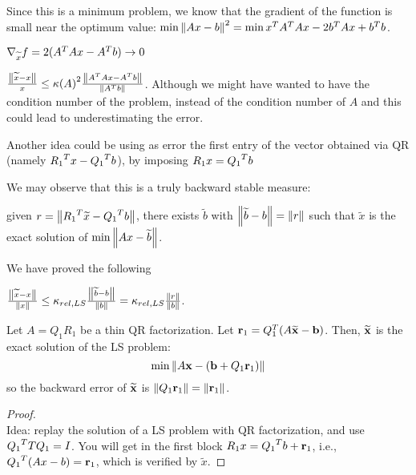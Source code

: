 \documentclass[ComputationalMathematics.tex]{subfiles}
\begin{document}
  Since this is a minimum problem, we know that the gradient of the function is small near the optimum value: $\min {\left\lVert Ax - b\right\rVert}^2 = \min {x}^{T} {A}^{T} A x  - 2 {b}^{T} A x + {b}^{T} b$.

  $\nabla_{\widetilde{x}} f = 2 ({A}^{T} A x - {A}^{T} b) \to 0$

  \begin{theorem}
    $\frac{\left\lVert\widetilde{x} - x\right\rVert}{x} \le {\kappa(A)}^2 \frac{\left\lVert{A}^{T} A x - {A}^{T} b\right\rVert}{\left\lVert{A}^{T} b\right\rVert}$. Although we might have wanted to have the condition number of the problem, instead of the condition number of $A$ and this could lead to underestimating the error.
  \end{theorem}

Another idea could be using as error the first entry of the vector obtained via QR (namely ${R_1}^{T} x - {Q_1}^{T} b$), by imposing $R_1 x = {Q_1}^{T} b$

We may observe that this is a truly backward stable measure:

given $r = \left\lVert{R_1}^{T} \widetilde{x} - {Q_1}^{T} b\right\rVert$, there exists $\widetilde{b}$ with $\left\lVert\widetilde{b} - b\right\rVert = \left\lVert r\right\rVert$ such that $\widetilde{x}$ is the exact solution of $\min \left\lVert Ax - \widetilde{b}\right\rVert$.

We have proved the following

\begin{proposition}
  $\frac{\left\lVert\widetilde{x} - x\right\rVert}{\left\lVert x\right\rVert} \le \kappa_{rel, LS} \frac{\left\lVert\widetilde{b} - b\right\rVert}{\left\lVert b\right\rVert} = \kappa_{rel, LS} \frac{\left\lVert r\right\rVert}{\left\lVert b\right\rVert}$.
\end{proposition}


\begin{theorem}
  Let $A=Q_1R_1$ be a thin QR factorization. Let $\mathbf{r}_1 = Q_1^T(A\widetilde{\mathbf{x}}-\mathbf{b})$. Then, $\widetilde{\mathbf{x}}$ is the exact solution of the LS problem:
\[
\min \left\lVert A\mathbf{x} - (\mathbf{b}+Q_1\mathbf{r}_1)\right\rVert
\]
so the backward error of $\widetilde{\mathbf{x}}$ is $\left\lVert Q_1\mathbf{r}_1\right\rVert = \left\lVert\mathbf{r}_1\right\rVert$.
\end{theorem}

\begin{proof}~\\
  Idea: replay the solution of a LS problem with QR factorization, and use ${Q_1}^{T}TQ_1=I$. You will get in the first block $R_1 x = {Q_1}^{T} b + \mathbf{r}_1$, i.e., ${Q_1}^{T}(Ax-b)=\mathbf{r}_1$, which is verified by $\widetilde{x}$.
\end{proof}
\end{document}
